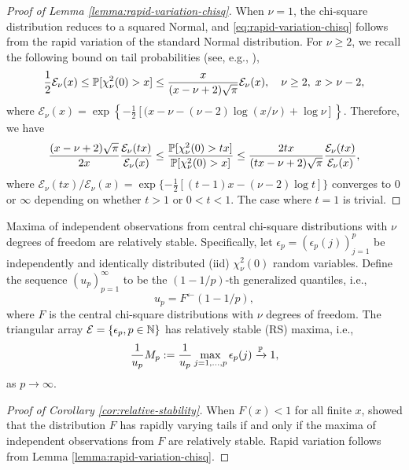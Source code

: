 \begin{proof}[Proof of Lemma \ref{lemma:rapid-variation-chisq}]
When $\nu=1$, the chi-square distribution reduces to a squared Normal, and \eqref{eq:rapid-variation-chisq} follows from the rapid variation of the standard Normal distribution.
For $\nu\ge2$, we recall the following bound on tail probabilities (see, e.g., \citep{inglot2010inequalities}),
$$
\frac{1}{2}\mathcal{E}_\nu(x) \le \P[\chi_\nu^2(0)>x] \le \frac{x}{(x-\nu+2)\sqrt{\pi}} \mathcal{E}_\nu(x), \quad \nu\ge2,\;x>\nu-2,
$$
where $\mathcal{E}_\nu(x) = \exp\left\{-\frac{1}{2}[(x-\nu-(\nu-2)\log(x/\nu) + \log\nu]\right\}$.
Therefore, we have 
$$
\frac{(x-\nu+2)\sqrt{\pi}}{2x}\frac{\mathcal{E}_\nu(tx)}{\mathcal{E}_\nu(x)} 
\le \frac{\P[\chi_\nu^2(0)>tx]}{\P[\chi_\nu^2(0)>x]}
\le \frac{2tx}{(tx-\nu+2)\sqrt{\pi}}\frac{\mathcal{E}_\nu(tx)}{\mathcal{E}_\nu(x)},
$$
where ${\mathcal{E}_\nu(tx)}/{\mathcal{E}_\nu(x)} = \exp\{-\frac{1}{2}[(t-1)x-(\nu-2)\log{t}]\}$ converges to $0$ or $\infty$ depending on whether $t>1$ or $0<t<1$.
The case where $t=1$ is trivial.
\end{proof}

\begin{corollary} \label{cor:relative-stability}
Maxima of independent observations from central chi-square distributions with $\nu$ degrees of freedom are relatively stable. 
Specifically, let $\epsilon_p = \left(\epsilon_p(j)\right)_{j=1}^p$ be independently and identically distributed (iid) $\chi_\nu^2(0)$ random variables. 
Define the sequence $(u_p)_{p=1}^\infty$ to be the $(1-1/p)$-th generalized quantiles, i.e., 
\begin{equation} \label{eq:quantiles}
    u_p = F^\leftarrow(1 - 1/p),
\end{equation}
where $F$ is the central chi-square distributions with $\nu$ degrees of freedom.
The triangular array ${\cal E} = \{\epsilon_p, p\in\N\}$ has relatively stable (RS) maxima, i.e.,
\begin{equation} \label{eq:RS-condition}
    \frac{1}{u_{p}} M_p := \frac{1}{u_{p}} \max_{j=1,\ldots,p} \epsilon_p(j) \xrightarrow{\P} 1,
\end{equation}
as $p\to\infty$.
\end{corollary}

\begin{proof}[Proof of Corollary \ref{cor:relative-stability}]
When $F(x)<1$ for all finite $x$, \citet{gnedenko1943distribution} showed that the distribution $F$ has rapidly varying tails if and only if the maxima of independent observations from $F$ are relatively stable.
Rapid variation follows from Lemma \ref{lemma:rapid-variation-chisq}.
\end{proof}


